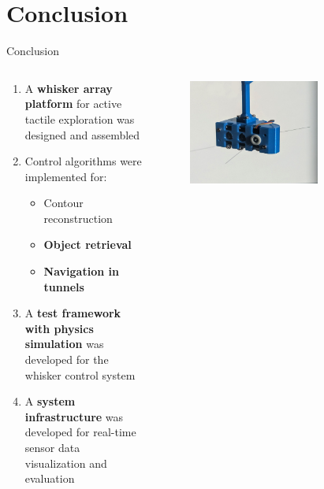 \documentclass[AIRbeamer
,optEnglish
,optBiber
,optBibstyleAlphabetic
,optBeamerClassicFormat%
]{AIRlatex}
\begin{document}
    \section{Conclusion}
    \begin{frame}{Conclusion}
        \begin{columns}[T,onlytextwidth]
            \begin{column}[T]{0.6\textwidth}
                \begin{enumerate}
                    \item A \textbf{whisker array platform} for active tactile exploration was designed and assembled
                    \item Control algorithms were implemented for:
                    \begin{itemize}
                        \item Contour reconstruction
                        \item \textbf{Object retrieval}
                        \item \textbf{Navigation in tunnels}
                    \end{itemize}
                    \item A \textbf{test framework with physics simulation} was developed for the whisker control system
                    \item A \textbf{system infrastructure} was developed for real-time sensor data visualization and evaluation
                \end{enumerate}
            \end{column}
            \begin{column}[T]{0.4\textwidth}
                \begin{figure}[H]
                    \centering
                    \captionsetup{justification=centering}
                    \includegraphics[width=0.7\textwidth]{figures/platform-two-whiskers}

\end{figure}
\end{column}
\end{columns}
\end{frame}
\end{document}
